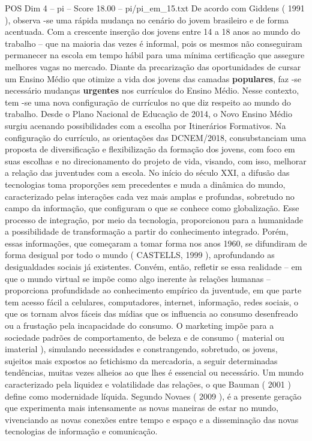 \begin{textsample}{POS Dim 4 – pi – Score 18.00 – pi/pi\_em\_15.txt}
De acordo com Giddens ( 1991 ), observa -se uma rápida mudança no cenário do jovem brasileiro e de forma acentuada.
Com a crescente inserção dos jovens entre 14 a 18 anos ao mundo do trabalho – que na maioria das vezes é informal, pois os mesmos não conseguiram permanecer na escola em tempo hábil para uma mínima certificação que assegure melhores vagas no mercado.
Diante da precarização das oportunidades de cursar um Ensino Médio que otimize a vida dos jovens das camadas \textbf{populares}, faz -se necessário mudanças \textbf{urgentes} nos currículos do Ensino Médio.
Nesse contexto, tem -se uma nova configuração de currículos no que diz respeito ao mundo do trabalho.
Desde o Plano Nacional de Educação de 2014, o Novo Ensino Médio surgiu acenando possibilidades com a escolha por Itinerários Formativos.
Na configuração do currículo, as orientações das DCNEM/2018, consubstanciam uma proposta de diversificação e flexibilização da formação dos jovens, com foco em suas escolhas e no direcionamento do projeto de vida, visando, com isso, melhorar a relação das juventudes com a escola.
No início do século XXI, a difusão das tecnologias toma proporções sem precedentes e muda a dinâmica do mundo, caracterizado pelas interações cada vez mais amplas e profundas, sobretudo no campo da informação, que configuram o que se conhece como globalização.
Esse processo de integração, por meio da tecnologia, proporcionou para a humanidade a possibilidade de transformação a partir do conhecimento integrado.
Porém, essas informações, que começaram a tomar forma nos anos 1960, se difundiram de forma desigual por todo o mundo ( CASTELLS, 1999 ), aprofundando as desigualdades sociais já existentes.
Convém, então, refletir se essa realidade – em que o mundo virtual se impõe como algo inerente às relações humanas – proporciona profundidade ao conhecimento empírico da juventude, em que parte tem acesso fácil a celulares, computadores, internet, informação, redes sociais, o que os tornam alvos fáceis das mídias que os influencia ao consumo desenfreado ou a frustação pela incapacidade do consumo.
O marketing impõe para a sociedade padrões de comportamento, de beleza e de consumo ( material ou imaterial ), simulando necessidades e constrangendo, sobretudo, os jovens, sujeitos mais expostos ao fetichismo da mercadoria, a seguir determinadas tendências, muitas vezes alheios ao que lhes é essencial ou necessário.
Um mundo caracterizado pela liquidez e volatilidade das relações, o que Bauman ( 2001 ) define como modernidade líquida.
Segundo Novaes ( 2009 ), é a presente geração que experimenta mais intensamente as novas maneiras de estar no mundo, vivenciando as novas conexões entre tempo e espaço e a disseminação das novas tecnologias de informação e comunicação.

\end{textsample}
